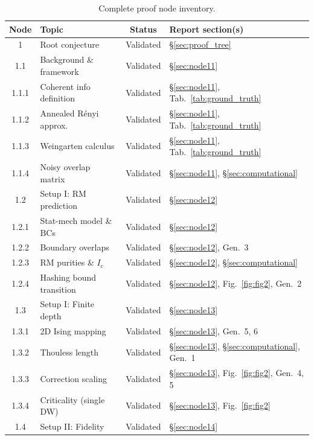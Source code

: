 \documentclass[11pt,a4paper]{article}
\newcommand{\Ic}{I_{\mathrm{c}}}
\begin{document}
\begin{table}[H]
\centering
\caption{Complete proof node inventory.}
\label{tab:nodes}
\small
\begin{tabular}{clcl}
\toprule
\textbf{Node} & \textbf{Topic} & \textbf{Status} & \textbf{Report section(s)} \\
\midrule
1       & Root conjecture                 & Validated & \S\ref{sec:proof_tree} \\
1.1     & Background \& framework         & Validated & \S\ref{sec:node11} \\
1.1.1   & Coherent info definition        & Validated & \S\ref{sec:node11}, Tab.~\ref{tab:ground_truth} \\
1.1.2   & Annealed R\'enyi approx.        & Validated & \S\ref{sec:node11}, Tab.~\ref{tab:ground_truth} \\
1.1.3   & Weingarten calculus             & Validated & \S\ref{sec:node11}, Tab.~\ref{tab:ground_truth} \\
1.1.4   & Noisy overlap matrix            & Validated & \S\ref{sec:node11}, \S\ref{sec:computational} \\
\midrule
1.2     & Setup I: RM prediction          & Validated & \S\ref{sec:node12} \\
1.2.1   & Stat-mech model \& BCs          & Validated & \S\ref{sec:node12} \\
1.2.2   & Boundary overlaps               & Validated & \S\ref{sec:node12}, Gen.~3 \\
1.2.3   & RM purities \& $\Ic$            & Validated & \S\ref{sec:node12}, \S\ref{sec:computational} \\
1.2.4   & Hashing bound transition        & Validated & \S\ref{sec:node12}, Fig.~\ref{fig:fig2}, Gen.~2 \\
\midrule
1.3     & Setup I: Finite depth           & Validated & \S\ref{sec:node13} \\
1.3.1   & 2D Ising mapping                & Validated & \S\ref{sec:node13}, Gen.~5, 6 \\
1.3.2   & Thouless length                 & Validated & \S\ref{sec:node13}, \S\ref{sec:computational}, Gen.~1 \\
1.3.3   & Correction scaling              & Validated & \S\ref{sec:node13}, Fig.~\ref{fig:fig2}, Gen.~4, 5 \\
1.3.4   & Criticality (single DW)         & Validated & \S\ref{sec:node13}, Fig.~\ref{fig:fig2} \\
\midrule
1.4     & Setup II: Fidelity              & Validated & \S\ref{sec:node14} \\

\end{tabular}
\end{table}
\end{document}
